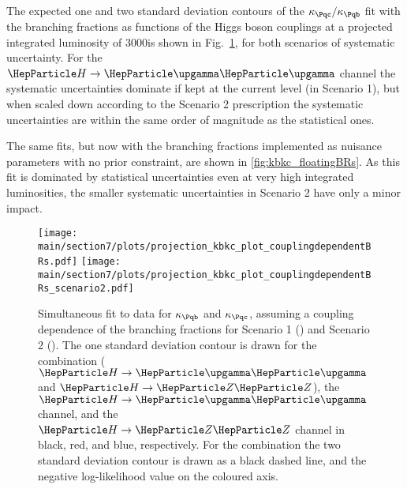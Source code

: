 \documentclass[../report.tex]{subfiles}
\providecommand{\main}{..}
\begin{document}
The expected one and two standard deviation contours of the $\kappac/\kappab$ fit with the branching fractions  as functions of the Higgs boson couplings at a projected integrated luminosity of $3000$\fbinv is shown in Fig.~\ref{fig:kbkc_couplingdependentBRs}, for both scenarios of systematic uncertainty.
% 
For the $\hgg$ channel the systematic uncertainties dominate if kept at the current level (\ie in Scenario 1), but when scaled down according to the Scenario 2 prescription the systematic uncertainties are within the same order of magnitude as the statistical ones.



The same fits, but now with the branching fractions implemented as nuisance parameters with no prior constraint, are shown in \ref{fig:kbkc_floatingBRs}.
% 
As this fit is dominated by statistical uncertainties even at very high integrated luminosities, the smaller systematic uncertainties in Scenario 2 have only a minor impact.



\begin{figure}[hbtp]
  \begin{center}
    \texttt{[image: \\main/section7/plots/projection\_kbkc\_plot\_couplingdependentBRs.pdf]}
    \texttt{[image: \\main/section7/plots/projection\_kbkc\_plot\_couplingdependentBRs\_scenario2.pdf]}
    \caption{
        Simultaneous fit to data for $\kappab$ and $\kappac$, assuming a coupling dependence of the branching fractions for Scenario 1 (\UcmsLeft) and Scenario 2 (\UcmsRight).
        The one standard deviation contour is drawn for the combination ($\hgg$ and $\hzz$), the $\hgg$ channel, and the $\hzz$ channel in black, red, and blue, respectively.
        For the combination the two standard deviation contour is drawn as a black dashed line, and the negative log-likelihood value on the coloured axis.
        }
    \label{fig:kbkc_couplingdependentBRs}
  \end{center}
\end{figure}
\end{document}

